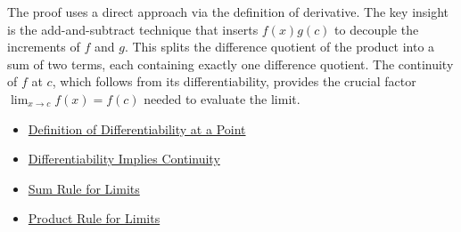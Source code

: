 \begin{remark*}
The proof uses a direct approach via the definition of derivative. The key insight is the add-and-subtract technique that inserts $f(x)g(c)$ to decouple the increments of $f$ and $g$. This splits the difference quotient of the product into a sum of two terms, each containing exactly one difference quotient. The continuity of $f$ at $c$, which follows from its differentiability, provides the crucial factor $\lim_{x \to c} f(x) = f(c)$ needed to evaluate the limit.
\end{remark*}

\begin{dependencies}
\begin{itemize}
  \item \hyperref[def:derivative-at-a-point]{Definition of Differentiability at a Point}
  \item \hyperref[thm:differentiable-implies-continuous]{Differentiability Implies Continuity}
  \item \hyperref[thm:limit-sum]{Sum Rule for Limits}
  \item \hyperref[thm:limit-product]{Product Rule for Limits}
\end{itemize}
\end{dependencies}

\clearpage

